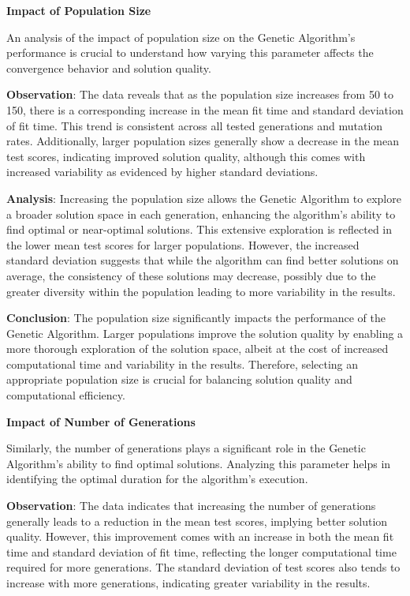 \documentclass{article}
\begin{document}
    \textbf{Impact of Population Size}

    An analysis of the impact of population size on the Genetic Algorithm’s performance is crucial to understand how varying this parameter affects the convergence behavior and solution quality.

    \textbf{Observation}: The data reveals that as the population size increases from 50 to 150, there is a corresponding increase in the mean fit time and standard deviation of fit time. This trend is consistent across all tested generations and mutation rates. Additionally, larger population sizes generally show a decrease in the mean test scores, indicating improved solution quality, although this comes with increased variability as evidenced by higher standard deviations.

    \textbf{Analysis}: Increasing the population size allows the Genetic Algorithm to explore a broader solution space in each generation, enhancing the algorithm's ability to find optimal or near-optimal solutions. This extensive exploration is reflected in the lower mean test scores for larger populations. However, the increased standard deviation suggests that while the algorithm can find better solutions on average, the consistency of these solutions may decrease, possibly due to the greater diversity within the population leading to more variability in the results.

    \textbf{Conclusion}: The population size significantly impacts the performance of the Genetic Algorithm. Larger populations improve the solution quality by enabling a more thorough exploration of the solution space, albeit at the cost of increased computational time and variability in the results. Therefore, selecting an appropriate population size is crucial for balancing solution quality and computational efficiency.

    \textbf{Impact of Number of Generations}

    Similarly, the number of generations plays a significant role in the Genetic Algorithm’s ability to find optimal solutions. Analyzing this parameter helps in identifying the optimal duration for the algorithm’s execution.

    \textbf{Observation}: The data indicates that increasing the number of generations generally leads to a reduction in the mean test scores, implying better solution quality. However, this improvement comes with an increase in both the mean fit time and standard deviation of fit time, reflecting the longer computational time required for more generations. The standard deviation of test scores also tends to increase with more generations, indicating greater variability in the results.
\end{document}
